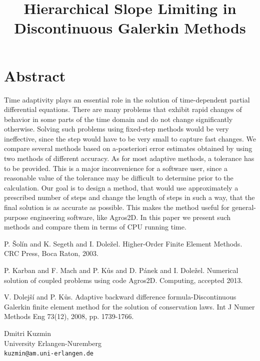 \documentclass[article, A4, 11pt]{llncs}%
\begin{document}
\section*{Abstract}
Time adaptivity plays an essential role in the solution of time-dependent partial differential equations. There are many problems that exhibit rapid changes of behavior in some parts of the time domain and do not change significantly otherwise. Solving such problems using fixed-step methods would be very ineffective, since the step would have to be very small to capture fast changes. We compare several methods based on a-posteriori error estimates obtained by using two methods of different accuracy. As for most adaptive methods, a tolerance has to be provided. This is a major inconvenience for a software user, since a reasonable value of the tolerance may be difficult to determine prior to the calculation. Our goal is to design a method, that would use approximately a prescribed number of steps and change the length of steps in such a way, that the final solution is as accurate as possible. This makes the method useful for general-purpose engineering software, like Agros2D. In this paper we present such methods and compare them in terms of CPU running time.


\begin{thebibliography}{10}
{\sc P. Šolín and K. Segeth and I. Doležel}. {Higher-Order Finite Element Methods}. CRC Press, Boca Raton, 2003.

{\sc P. Karban and F. Mach and P. Kůs and D. Pánek and I. Doležel}. {Numerical solution of coupled problems using code Agros2D}. Computing, accepted 2013.

{\sc V. Dolejší and P. Kůs}. {Adaptive backward difference formula-Discontinuous Galerkin finite element method for the solution of conservation laws}. Int J Numer Methods Eng  73(12), 2008, pp. 1739-1766.
\end{thebibliography} %

\title{Hierarchical Slope Limiting in  Discontinuous Galerkin Methods}
 \author{} \institute{}
\maketitle
\begin{center}
{\large Dmitri Kuzmin}\\
University Erlangen-Nuremberg\\
{\tt kuzmin@am.uni-erlangen.de}
\end{center}
\end{document}

